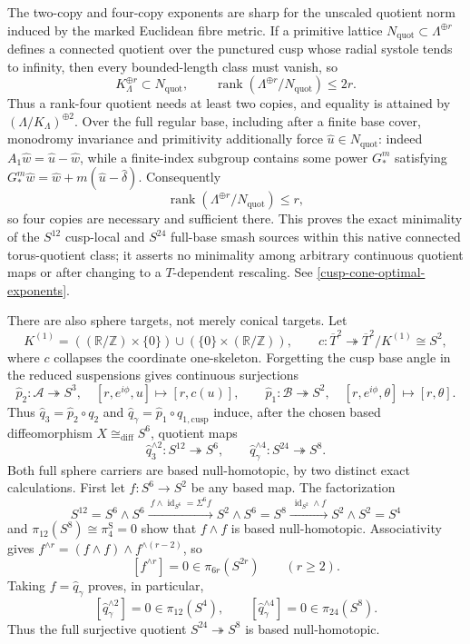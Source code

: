 \begin{enumerate}[leftmargin=1.8em,itemsep=.65em]
The two-copy and four-copy exponents are sharp for the unscaled quotient
norm induced by the marked Euclidean fibre metric.  If a primitive lattice
\(N_{\mathrm{quot}}\subset\Lambda^{\oplus r}\) defines a connected quotient
over the punctured cusp whose radial systole tends to infinity, then every
bounded-length class must vanish, so
\[
 K_\Lambda^{\oplus r}\subset N_{\mathrm{quot}},\qquad
 \operatorname{rank}(\Lambda^{\oplus r}/N_{\mathrm{quot}})\le2r.
\]
Thus a rank-four quotient needs at least two copies, and equality is attained
by \((\Lambda/K_\Lambda)^{\oplus2}\).  Over the full regular base, including
after a finite base cover, monodromy invariance and primitivity additionally
force \(\widehat u\in N_{\mathrm{quot}}\): indeed
\(A_1\widehat w=\widehat u-\widehat w\), while a finite-index subgroup contains
some power \(G_*^m\) satisfying
\(G_*^m\widehat w=\widehat w+m(\widehat u-\widehat\delta)\).
Consequently
\[
 \operatorname{rank}(\Lambda^{\oplus r}/N_{\mathrm{quot}})\le r,
\]
so four copies are necessary and sufficient there.  This proves the exact
minimality of the \(S^{12}\) cusp-local and \(S^{24}\) full-base smash
sources within this native connected torus-quotient class; it asserts no
minimality among arbitrary continuous quotient maps or after changing to a
\(T\)-dependent rescaling.  See \cref{cusp-cone-optimal-exponents}.

There are also sphere targets, not merely conical targets.  Let
\[
 K^{(1)}=((\mathbb R/\mathbb Z)\times\{0\})
 \cup(\{0\}\times(\mathbb R/\mathbb Z)),\qquad
 c:\overline T^2\twoheadrightarrow\overline T^2/K^{(1)}\cong S^2,
\]
where \(c\) collapses the coordinate one-skeleton.  Forgetting the cusp base
angle in the reduced suspensions gives continuous surjections
\[
 \widehat p_2:\mathcal A\twoheadrightarrow S^3,
 \quad[r,e^{i\phi},u]\longmapsto[r,c(u)],
 \qquad
 \widehat p_1:\mathcal B\twoheadrightarrow S^2,
 \quad[r,e^{i\phi},\theta]\longmapsto[r,\theta].
\]
Thus \(\widehat q_3=\widehat p_2\circ q_2\) and
\(\widehat q_\gamma=\widehat p_1\circ q_{1,\mathrm{cusp}}\) induce, after the
chosen based diffeomorphism \(X\cong_{\mathrm{diff}}S^6\), quotient maps
\[
 \widehat q_3^{\wedge2}:S^{12}\twoheadrightarrow S^6,
 \qquad
 \widehat q_\gamma^{\wedge4}:S^{24}\twoheadrightarrow S^8.
\]
Both full sphere carriers are based null-homotopic, by two distinct exact
calculations.  First let \(f:S^6\to S^2\) be any based map.  The factorization
\[
 S^{12}=S^6\wedge S^6
 \xrightarrow{\ f\wedge\operatorname{id}_{S^6}=\Sigma^6f\ }
 S^2\wedge S^6=S^8
 \xrightarrow{\ \operatorname{id}_{S^2}\wedge f\ }
 S^2\wedge S^2=S^4
\]
and
\(\pi_{12}(S^8)\cong\pi_4^{\mathrm S}=0\) show that \(f\wedge f\) is
based null-homotopic.  Associativity gives
\(f^{\wedge r}=(f\wedge f)\wedge f^{\wedge(r-2)}\), so
\[
 [f^{\wedge r}]=0\in\pi_{6r}(S^{2r})
 \qquad(r\ge2).
\]
Taking \(f=\widehat q_\gamma\) proves, in particular,
\[
 [\widehat q_\gamma^{\wedge2}]=0\in\pi_{12}(S^4),
 \qquad
 [\widehat q_\gamma^{\wedge4}]=0\in\pi_{24}(S^8).
\]
Thus the full surjective quotient \(S^{24}\twoheadrightarrow S^8\) is based
null-homotopic.


\end{enumerate}
